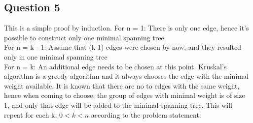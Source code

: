 \documentclass{article}
\begin{document}
\clearpage

\subsection*{Question 5}
This is a simple proof by induction.
For n = 1: There is only one edge, hence it's possible to construct only one
minimal spanning tree\\
For n = k - 1: Assume that (k-1) edges were chosen by now, and they resulted
only in one minimal spanning tree\\
For n = k: An additional edge needs to be chosen at this point. Kruskal's
algorithm is a greedy algorithm and it always chooses the edge with the minimal
weight available. It is known that there are no to edges with the same weight,
hence when coming to choose, the group of edges with minimal weight is of size
1, and only that edge will be added to the minimal spanning tree.
This will repeat for each k, $0 < k < n$ according to the problem statement.
\end{document}
